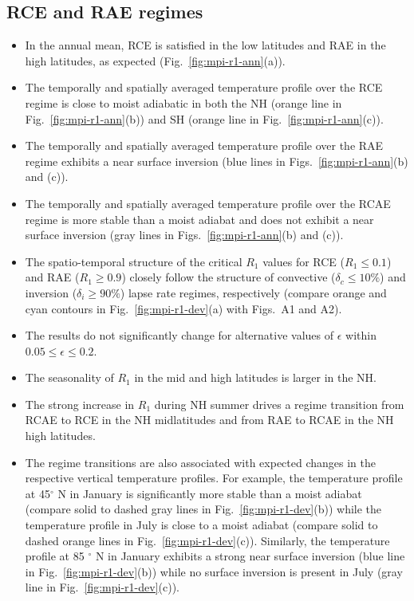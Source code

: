 \documentclass{ametsocV5}
\begin{document}
\subsection{RCE and RAE regimes}
\begin{itemize}
  \item In the annual mean, RCE is satisfied in the low latitudes and RAE in the high latitudes, as expected (Fig.~\ref{fig:mpi-r1-ann}(a)).
  \item The temporally and spatially averaged temperature profile over the RCE regime is close to moist adiabatic in both the NH (orange line in Fig.~\ref{fig:mpi-r1-ann}(b)) and SH (orange line in Fig.~\ref{fig:mpi-r1-ann}(c)).
  \item The temporally and spatially averaged temperature profile over the RAE regime exhibits a near surface inversion (blue lines in Figs.~\ref{fig:mpi-r1-ann}(b) and (c)).
  \item The temporally and spatially averaged temperature profile over the RCAE regime is more stable than a moist adiabat and does not exhibit a near surface inversion (gray lines in Figs.~\ref{fig:mpi-r1-ann}(b) and (c)).
  \item The spatio-temporal structure of the critical \(R_{1}\) values for RCE (\(R_{1}\le 0.1\)) and RAE (\(R_{1}\ge 0.9\)) closely follow the structure of convective (\(\delta_{c}\le 10\%\)) and inversion (\(\delta_{i}\ge 90\%\)) lapse rate regimes, respectively (compare orange and cyan contours in Fig.~\ref{fig:mpi-r1-dev}(a) with Figs.~A1 and A2).
  \item The results do not significantly change for alternative values of \(\epsilon\) within \(0.05 \le \epsilon \le 0.2\).
  \item The seasonality of \(R_{1}\) in the mid and high latitudes is larger in the NH.
  \item The strong increase in \(R_{1}\) during NH summer drives a regime transition from RCAE to RCE in the NH midlatitudes and from RAE to RCAE in the NH high latitudes.
  \item The regime transitions are also associated with expected changes in the respective vertical temperature profiles. For example, the temperature profile at 45$^{\circ}$ N in January is significantly more stable than a moist adiabat (compare solid to dashed gray lines in Fig.~\ref{fig:mpi-r1-dev}(b)) while the temperature profile in July is close to a moist adiabat (compare solid to dashed orange lines in Fig.~\ref{fig:mpi-r1-dev}(c)). Similarly, the temperature profile at 85 $^{\circ}$ N in January exhibits a strong near surface inversion (blue line in Fig.~\ref{fig:mpi-r1-dev}(b)) while no surface inversion is present in July (gray line in Fig.~\ref{fig:mpi-r1-dev}(c)).

\end{itemize}
\end{document}
